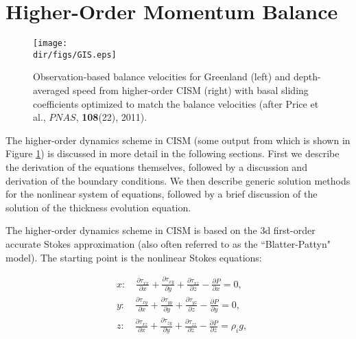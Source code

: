 
\section{Higher-Order Momentum Balance}
\label{sc:higher-order-mom}

\begin{figure}
  \begin{center}
    \texttt{[image: \\dir/figs/GIS.eps]}
   \end{center}
  \caption{Observation-based balance velocities for Greenland (left) and depth-averaged speed from higher-order CISM (right) with basal sliding coefficients optimized to match the balance velocities (after Price et al., $PNAS$, \textbf{108}(22), 2011).}
  \label{fig:GIS_PNAS}
\end{figure} 

The higher-order dynamics scheme in CISM (some output from which is shown in Figure \ref{fig:GIS_PNAS}) is discussed in more detail in the following sections. 
First we describe the derivation of the equations themselves, followed by a discussion and derivation of the boundary conditions.
We then describe generic solution methods for the nonlinear system of equations, followed by a
brief discussion of the solution of the thickness evolution equation.


The higher-order dynamics scheme in CISM is based on the 3d first-order accurate Stokes approximation (also often referred to as the ``Blatter-Pattyn" model). The starting point is the nonlinear Stokes equations:

\begin{equation}
  \begin{split}
    & x:\quad \frac{\partial \tau _{xx}}{\partial x} + \frac{\partial \tau _{xy}}{\partial y} + \frac{\partial \tau _{xz}}{\partial z} - \frac{\partial P}{\partial x} = 0, \\ 
    & y:\quad \frac{\partial \tau _{xy}}{\partial x} + \frac{\partial \tau _{yy}}{\partial y} + \frac{\partial \tau _{yz}}{\partial z} - \frac{\partial P}{\partial y} = 0, \\ 
    & z:\quad \frac{\partial \tau _{xz}}{\partial x} + \frac{\partial \tau _{zy}}{\partial y} + \frac{\partial \tau _{zz}}{\partial z} - \frac{\partial P}{\partial z} = \rho_i g,
  \end{split}
\end{equation}

